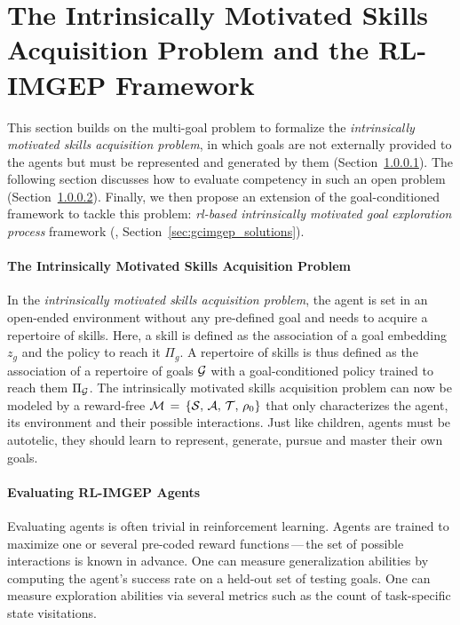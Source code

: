 \section{The Intrinsically Motivated Skills Acquisition Problem and the RL-IMGEP Framework}
\label{sec:im_pb_solution}
This section builds on the multi-goal \rl problem to formalize the \textit{intrinsically motivated skills acquisition problem}, in which goals are not externally provided to the agents but must be represented and generated by them (Section~\ref{sec:im_pb}). The following section discusses how to evaluate competency in such an open problem (Section~\ref{sec:eval}). Finally, we then propose an extension of the goal-conditioned \rl framework to tackle this problem: \textit{\textsl{rl}-based intrinsically motivated goal exploration process} framework (\rlimgep, Section~\ref{sec:gcimgep_solutions}). 

\paragraph{The Intrinsically Motivated Skills Acquisition Problem}
\label{sec:im_pb}
In the \textit{intrinsically motivated skills acquisition problem}, the agent is set in an open-ended environment without any pre-defined goal and needs to acquire a repertoire of skills. Here, a skill is defined as the association of a goal embedding $z_g$ and the policy to reach it $\Pi_g$. A repertoire of skills is thus defined as the association of a repertoire of goals $\mathcal{G}$ with a goal-conditioned policy trained to reach them $\Pi_{\mathcal{G}}$. The intrinsically motivated skills acquisition problem can now be modeled by a reward-free \mdp $\mathcal{M}\,=\,\{\mathcal{S},\, \mathcal{A},\, \mathcal{T},\, \rho_0\}$ that only characterizes the agent, its environment and their possible interactions. Just like children, agents must be autotelic, \ie they should learn to represent, generate, pursue and master their own goals.


\paragraph{Evaluating RL-IMGEP Agents}
\label{sec:eval}

Evaluating agents is often trivial in reinforcement learning. Agents are trained to maximize one or several pre-coded reward functions\,---\,the set of possible interactions is known in advance. One can measure generalization abilities by computing the agent's success rate on a held-out set of testing goals. One can measure exploration abilities via several metrics such as the count of task-specific state visitations.

